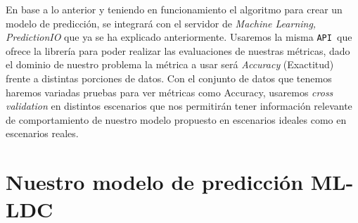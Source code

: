 En base a lo anterior y teniendo en funcionamiento el algoritmo para crear un modelo de predicción, se integrará con el servidor de \emph{Machine Learning, PredictionIO} que ya se ha explicado anteriormente. Usaremos la misma \texttt{API }que ofrece la librería para poder realizar las evaluaciones de nuestras métricas, dado el dominio de nuestro problema la métrica a usar será \emph{Accuracy} (Exactitud) frente a distintas porciones de datos. Con el conjunto de datos que tenemos haremos variadas pruebas para ver métricas como Accuracy, usaremos \emph{cross validation} en distintos escenarios que nos permitirán tener información relevante de comportamiento de nuestro modelo propuesto en escenarios ideales como en escenarios reales.





\section{Nuestro modelo de predicción ML-LDC}\label{sec:nuestromodelopredict-mlldc}






